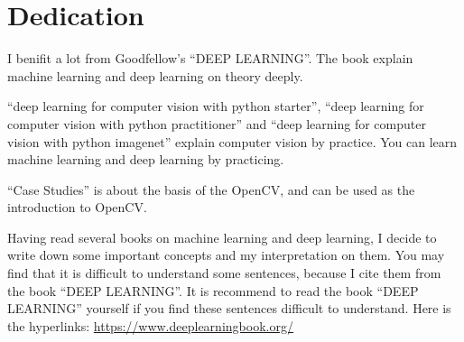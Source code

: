 \chapter*{Dedication}
I benifit a lot from Goodfellow's ``DEEP LEARNING''. The book explain machine learning and deep learning on theory deeply.

``deep learning for computer vision with python starter'', ``deep learning for computer vision with python practitioner'' and ``deep learning for computer vision with python imagenet'' explain computer vision by practice. You can learn machine learning and deep learning by practicing.

``Case Studies'' is about the basis of the OpenCV, and can be used as the introduction to OpenCV.



Having read several books on machine learning and deep learning, I decide to write down some important concepts and my interpretation on them.
You may find that it is difficult to understand some sentences, because I cite them from the book ``DEEP LEARNING''.
It is recommend to read the book ``DEEP LEARNING'' yourself if you find these sentences difficult to understand.
Here is the hyperlinks: \url{https://www.deeplearningbook.org/}


